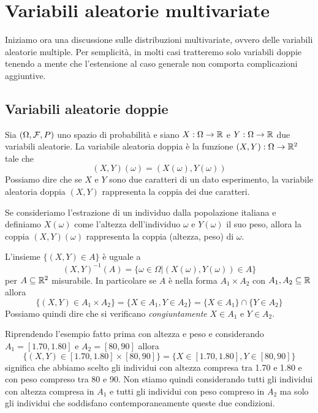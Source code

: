 \chapter{Variabili aleatorie multivariate}
Iniziamo ora una discussione sulle distribuzioni multivariate, ovvero delle variabili aleatorie
multiple. Per semplicità, in molti casi tratteremo solo variabili doppie tenendo a mente che
l'estensione al caso generale non comporta complicazioni aggiuntive.

\section{Variabili aleatorie doppie}
Sia $(\Omega, \mathcal{F}, P)$ uno spazio di probabilità e siano $X : \Omega \to \mathbb{R}$ e $Y : \Omega \to \mathbb{R}$
due variabili aleatorie. La variabile aleatoria doppia è la funzione $(X, Y) : \Omega \to \mathbb{R}^2$
tale che
\[ (X, Y)(\omega) = (X(\omega), Y(\omega)) \]
Possiamo dire che se $X$ e $Y$ sono due caratteri di un dato esperimento, la variabile aleatoria
doppia $(X, Y)$ rappresenta la coppia dei due caratteri.

\begin{example}
	Se consideriamo l'estrazione di un individuo dalla popolazione italiana e definiamo $X(\omega)$
	come l'altezza dell'individuo $\omega$ e $Y(\omega)$ il suo peso, allora la coppia
	$(X, Y)(\omega)$ rappresenta la coppia (altezza, peso) di $\omega$.
\end{example}

L'insieme $\{ (X, Y) \in A \}$ è uguale a
\[ (X, Y)^{-1} (A) = \{ \omega \in \Omega | (X(\omega), Y(\omega)) \in A \} \]
per $A \subseteq \mathbb{R}^2$ misurabile. In particolare se $A$ è nella forma $A_1 \times A_2$ con
$A_1, A_2 \subseteq \mathbb{R}$ allora
\[
	\{ (X, Y) \in A_1 \times A_2 \} = \{ X \in A_1, Y \in A_2 \} =
	\{ X \in A_1 \} \cap \{ Y \in A_2 \}
\]
Possiamo quindi dire che si verificano \emph{congiuntamente} $X \in A_1$ e $Y \in A_2$.

\begin{example}
	Riprendendo l'esempio fatto prima con altezza e peso e considerando $A_1 = [1.70, 1.80]$ e
	$A_2 = [80, 90]$ allora
	\[ \{ (X, Y) \in [1.70, 1.80] \times [80, 90] \} = \{ X \in [1.70, 1.80], Y \in [80, 90] \} \]
	significa che abbiamo scelto gli individui con altezza compresa tra 1.70 e 1.80 e con peso
	compreso tra 80 e 90. Non stiamo quindi considerando tutti gli individui con altezza compresa
	in $A_1$ e tutti gli individui con peso compreso in $A_2$ ma solo gli individui che soddisfano
	contemporaneamente queste due condizioni.
\end{example}

